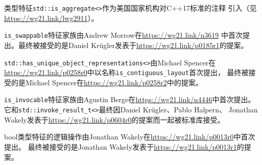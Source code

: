 类型特征\texttt{std::is\_aggregate<>}作为美国国家机构对C++17标准的注释
引入（见\url{https://wg21.link/lwg2911}）。

\texttt{is\_swappable}特征家族由Andrew Morrow在\url{https://wg21.link/n3619}
中首次提出。最终被接受的是Daniel Krügler发表于\url{https://wg21.link/p0185r1}的提案。

\texttt{std::has\_unique\_object\_representations<>}由Michael Spencer在
\url{https://wg21.link/p0258r0}中以名称\texttt{is\_contiguous\_layout}首次提出，
最终被接受的是Michael Spencer在\url{https://wg21.link/p0258r2}中的提案。

\texttt{is\_invocable}特征家族由Agustin Berge在\url{https://wg21.link/n4446}中首次提出。\\
它和\texttt{std::invoke\_result\_t<>}最终因Daniel Krügler、Pablo Halpern、
Jonathan Wakely发表于\url{https://wg21.link/p0604r0}的提案而一起被标准库接受。

bool类型特征的逻辑操作由Jonathan Wakely在\url{https://wg21.link/p0013r0}中首次提出。
最终被接受的是Jonathan Wakely发表于\url{https://wg21.link/p0013r1}的提案。